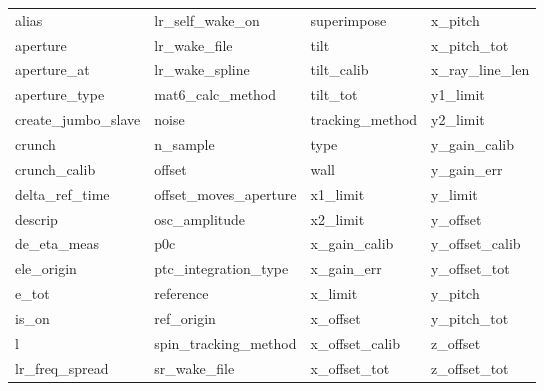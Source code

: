  \begin{tabular}{llll} \toprule
alias                       & lr_self_wake_on             & superimpose                 & x_pitch                     \\
aperture                    & lr_wake_file                & tilt                        & x_pitch_tot                 \\
aperture_at                 & lr_wake_spline              & tilt_calib                  & x_ray_line_len              \\
aperture_type               & mat6_calc_method            & tilt_tot                    & y1_limit                    \\
create_jumbo_slave          & noise                       & tracking_method             & y2_limit                    \\
crunch                      & n_sample                    & type                        & y_gain_calib                \\
crunch_calib                & offset                      & wall                        & y_gain_err                  \\
delta_ref_time              & offset_moves_aperture       & x1_limit                    & y_limit                     \\
descrip                     & osc_amplitude               & x2_limit                    & y_offset                    \\
de_eta_meas                 & p0c                         & x_gain_calib                & y_offset_calib              \\
ele_origin                  & ptc_integration_type        & x_gain_err                  & y_offset_tot                \\
e_tot                       & reference                   & x_limit                     & y_pitch                     \\
is_on                       & ref_origin                  & x_offset                    & y_pitch_tot                 \\
l                           & spin_tracking_method        & x_offset_calib              & z_offset                    \\
lr_freq_spread              & sr_wake_file                & x_offset_tot                & z_offset_tot                \\
 \bottomrule
 \end{tabular}
 \vfill
 
